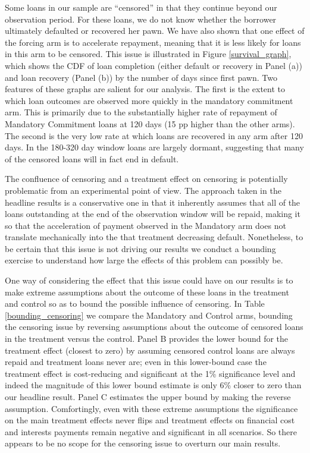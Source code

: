 \begin{appendix}
Some loans in our sample are ``censored'' in that they continue beyond our observation period.  For these loans, we do not know whether the borrower ultimately defaulted or recovered her pawn.   We have also shown that one effect of the forcing arm is to accelerate repayment, meaning that it is less likely for loans in this arm to be censored.  This issue is illustrated in Figure \ref{survival_graph}, which shows the CDF of loan completion (either default or recovery in Panel (a)) and loan recovery (Panel (b)) by the number of days since first pawn.  Two features of these graphs are salient for our analysis.  The first is the extent to which loan outcomes are observed more quickly in the mandatory commitment arm.  This is primarily due to the substantially higher rate of repayment of Mandatory Commitment loans at 120 days (15 pp higher than the other arms).  The second is the very low rate at which loans are recovered in any arm after 120 days.  In the 180-320 day window loans are largely dormant, suggesting that many of the censored loans will in fact end in default.

The confluence of censoring and a treatment effect on censoring is potentially problematic from an experimental point of view.  The approach taken in the headline results is a conservative one in that it inherently assumes that all of the loans outstanding at the end of the observation window will be repaid, making it so that the acceleration of payment observed in the Mandatory arm does not translate mechanically into the that treatment decreasing default.  Nonetheless, to be certain that this issue is not driving our results we conduct a bounding exercise to understand how large the effects of this problem can possibly be.  

One way of considering the effect that this issue could have on our results is to make extreme assumptions about the outcome of these loans in the treatment and control so as to bound the possible influence of censoring. In Table \ref{bounding_censoring} we compare the Mandatory and Control arms, bounding the censoring issue by reversing assumptions about the outcome of censored loans in the treatment versus the control.   Panel B provides the lower bound for the treatment effect (closest to zero) by assuming censored control loans are always repaid and treatment loans never are; even in this lower-bound case the treatment effect is cost-reducing and significant at the 1\% significance level and indeed the magnitude of this lower bound estimate is only 6\% closer to zero than our headline result.   Panel C estimates the upper bound by making the reverse assumption.  Comfortingly, even with these extreme assumptions the significance on the main treatment effects never flips and treatment effects on financial cost and interests payments remain negative and significant in all scenarios.  So there appears to be no scope for the censoring issue to overturn our main results. 


\end{appendix}
